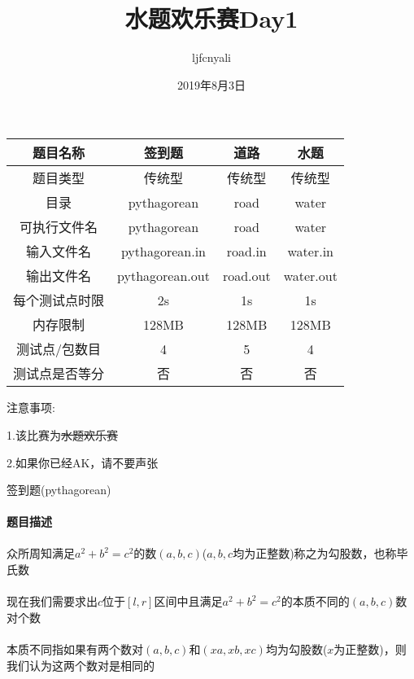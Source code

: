 \documentclass[UTF8]{ctexart}
\begin{document}
\title{水题欢乐赛Day1}
\author{ljfcnyali}
\date{2019年8月3日}
\maketitle

\begin{table}[!htbp]
	\centering
	\begin{tabular}{|c|c|c|c|}
		\hline
		题目名称&签到题&道路&水题\\
		\hline
        题目类型&传统型&传统型&传统型\\
        \hline
        目录&pythagorean&road&water\\
        \hline
        可执行文件名&pythagorean&road&water\\
        \hline
        输入文件名&pythagorean.in&road.in&water.in\\
        \hline
        输出文件名&pythagorean.out&road.out&water.out\\
        \hline
        每个测试点时限&2s&1s&1s\\
        \hline
        内存限制&128MB&128MB&128MB\\
        \hline
        测试点/包数目&4&5&4\\
        \hline
        测试点是否等分&否&否&否\\
		\hline
    \end{tabular}
\end{table}

注意事项:

1.该比赛为\sout{水题欢乐赛}

2.如果你已经AK，请不要声张

\clearpage

\begin{center}
    \large{签到题(pythagorean)}
\end{center}
\paragraph{题目描述}
\paragraph{}众所周知满足$a^2+b^2=c^2$的数$(a,b,c)$($a,b,c$均为正整数)称之为勾股数，也称毕氏数
\paragraph{}现在我们需要求出$c$位于$[l,r]$区间中且满足$a^2+b^2=c^2$的本质不同的$(a,b,c)$数对个数
\paragraph{}本质不同指如果有两个数对$(a,b,c)$和$(xa,xb,xc)$均为勾股数($x$为正整数)，则我们认为这两个数对是相同的
\end{document}
